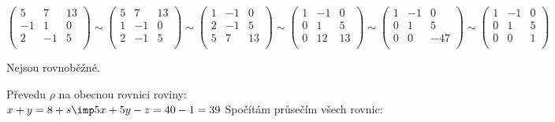      $ \begin{pmatrix}
	      5 &7 & 13 \\ 
	      -1 &1 & 0 \\ 
	      2 &-1 & 5 \\ 
      \end{pmatrix}
      \sim
      \begin{pmatrix}
	      5 &7 & 13 \\ 
	      1 &-1 & 0 \\ 
	      2 &-1 & 5 \\ 
      \end{pmatrix}
      \sim
      \begin{pmatrix}
	      1 &-1 & 0 \\ 
	      2 &-1 & 5 \\ 
	      5 &7 & 13 \\ 
      \end{pmatrix}
      \sim
      \begin{pmatrix}
	      1 &-1 & 0 \\ 
	      0 &1 & 5 \\ 
	      0 &12 & 13 \\ 
      \end{pmatrix}
      \sim
      \begin{pmatrix}
	      1 &-1 & 0 \\ 
	      0 &1 & 5 \\ 
	      0 &0 & -47 \\ 
      \end{pmatrix}
      \sim
      \begin{pmatrix}
	      1 &-1 & 0 \\ 
	      0 &1 & 5 \\ 
	      0 &0 & 1 \\ 
      \end{pmatrix}
       $

       Nejsou rovnoběžné.

       Převedu $\rho$ na obecnou rovnici roviny:
       $x+y = 8 + s \imp 5x + 5y - z = 40-1 = 39$
       Spočítám průsečím všech rovnic:


